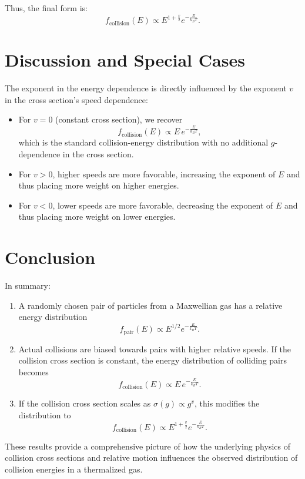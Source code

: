 Thus, the final form is:
\begin{equation}
  f_{\text{collision}}(E) \propto E^{1 + \frac{v}{2}} e^{-\frac{E}{k_B T}}.
\end{equation}

\section{Discussion and Special Cases}

The exponent in the energy dependence is directly influenced by the exponent $v$ in the cross section's speed dependence:
\begin{itemize}
  \item For $v=0$ (constant cross section), we recover 
  \[
  f_{\text{collision}}(E) \propto E \, e^{-\frac{E}{k_B T}},
  \]
  which is the standard collision-energy distribution with no additional $g$-dependence in the cross section.

  \item For $v > 0$, higher speeds are more favorable, increasing the exponent of $E$ and thus placing more weight on higher energies.

  \item For $v < 0$, lower speeds are more favorable, decreasing the exponent of $E$ and thus placing more weight on lower energies.
\end{itemize}

\section{Conclusion}

In summary:
\begin{enumerate}
  \item A randomly chosen pair of particles from a Maxwellian gas has a relative energy distribution
  \[
  f_{\text{pair}}(E) \propto E^{1/2} e^{-\frac{E}{k_B T}}.
  \]

  \item Actual collisions are biased towards pairs with higher relative speeds. If the collision cross section is constant, the energy distribution of colliding pairs becomes
  \[
  f_{\text{collision}}(E) \propto E \, e^{-\frac{E}{k_B T}}.
  \]

  \item If the collision cross section scales as $\sigma(g) \propto g^{v}$, this modifies the distribution to
  \[
  f_{\text{collision}}(E) \propto E^{1 + \frac{v}{2}} e^{-\frac{E}{k_B T}}.
  \]
  \end{enumerate}

These results provide a comprehensive picture of how the underlying physics of collision cross sections and relative motion influences the observed distribution of collision energies in a thermalized gas.
